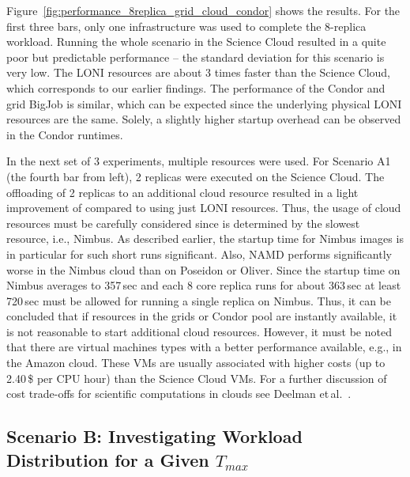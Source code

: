 \documentclass[graybox]{svmult}
\begin{document}
Figure~\ref{fig:performance_8replica_grid_cloud_condor} shows the
results. For the first three bars, only one infrastructure was used to
complete the 8-replica workload. Running the whole scenario in the
Science Cloud resulted in a quite poor but predictable performance --
the standard deviation for this scenario is very low. The LONI
resources are about 3 times faster than the Science Cloud, which
corresponds to our earlier findings.  The performance of the Condor
and grid BigJob is similar, which can be expected since the underlying
physical LONI resources are the same.  Solely, a slightly higher
startup overhead can be observed in the Condor runtimes.

In the next set of 3 experiments, multiple resources were used. For
Scenario A1 (the fourth bar from left), 2 replicas were executed on
the Science Cloud. The offloading of 2 replicas to an additional cloud
resource resulted in a light improvement of \tc compared to using
just LONI resources. Thus, the usage of cloud resources must be carefully
considered since \tc is determined by the slowest resource, i.e., Nimbus. As
described earlier, the startup time for Nimbus images is in particular
for such short runs significant. Also, NAMD performs significantly
worse in the Nimbus cloud than on Poseidon or Oliver. Since the
startup time on Nimbus averages to 357\,sec and each 8 core replica runs
for about 363\,sec at least 720\,sec must be allowed for running a single replica on
Nimbus. Thus, it can be concluded that if resources in the grids or
Condor pool are instantly available, it is not reasonable to start
additional cloud resources.  However, it must be noted that there are
virtual machines types with a better performance available, e.g., in
the Amazon cloud. These VMs are usually associated with higher costs
(up to 2.40\,\$ per CPU hour) than the Science Cloud VMs. For a
further discussion of cost trade-offs for scientific computations in
clouds see Deelman et\,al.~\cite{1413421}.


\subsection{Scenario B: Investigating Workload Distribution 
            for a Given $T_{max}$\\}
\end{document}
